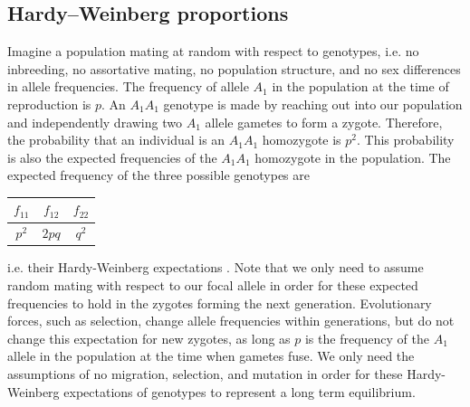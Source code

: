 \subsection{Hardy--Weinberg proportions}

Imagine a population mating at random with respect to genotypes, i.e. no
inbreeding, no assortative mating, no population structure, and no sex
differences in allele frequencies. The frequency of allele $A_1$ in the
population at the time of reproduction is $p$. An $A_1A_1$ genotype is made by
reaching out into our population and independently drawing two $A_1$ allele
gametes to form a zygote. Therefore, the probability that an individual is an
$A_1A_1$ homozygote is $p^2$. This probability is also the expected frequencies
of the $A_1A_1$ homozygote in the population. The expected frequency of the
three possible genotypes are


\begin{center}
\begin{tabular}{ccc}
\hline
$f_{11}$ & $f_{12}$ & $f_{22}$ \\
\hline
$p^2$ & $2pq$ & $q^2$ \\
\end{tabular}
\end{center}
i.e. their Hardy-Weinberg expectations \citep{hardy1908mendelian,weinberg1908ber}.
Note that we only need to assume random mating with respect to our
focal allele in order for these expected frequencies to hold in the
zygotes forming the next generation. Evolutionary forces, such as
selection, change allele frequencies within generations, but do not
change this expectation for new zygotes, as long as $p$ is the
frequency of the $A_1$ allele in the population at the time when
gametes fuse. We only need the assumptions of no migration, selection,
and mutation in order for these Hardy-Weinberg expectations of
genotypes to represent a long term equilibrium.


